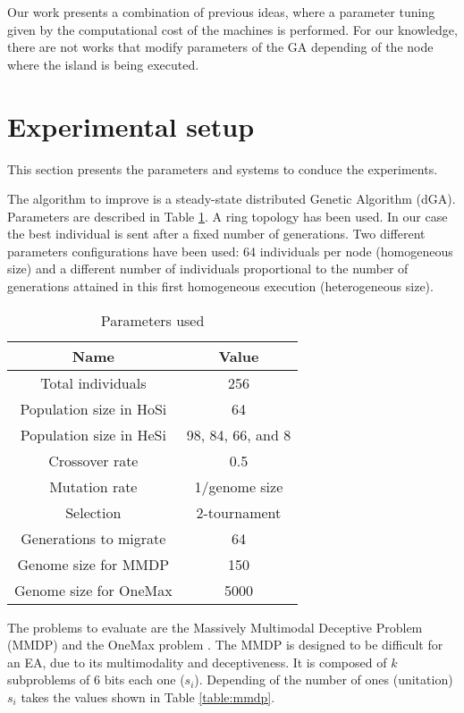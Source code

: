 \documentclass{sig-alternate}
\begin{document}
 Our work presents a combination of previous ideas, where a parameter tuning given by the computational cost of the machines is performed. For our knowledge, there are not works that modify parameters of the GA depending of the node where the island is being executed.


\section{Experimental setup}
\label{subsec:experiments}
This section presents the parameters and systems to conduce the experiments.

The algorithm to improve is a steady-state distributed Genetic Algorithm (dGA). Parameters are described in Table \ref{table:parameters}. A ring topology has been used. In our case the best individual is sent after a fixed number of generations.  Two different parameters configurations have been used: 64 individuals per node (homogeneous size) and a different number of individuals proportional to the number of generations attained in this first homogeneous execution (heterogeneous size).


\begin{table}
\centering
\begin{tabular}{|c|c|} \hline
Name & Value\\ \hline
Total individuals & 256\\ \hline
Population size in HoSi & 64 \\ \hline
Population size in HeSi & 98, 84, 66, and 8\\ \hline
Crossover rate & 0.5\\ \hline
Mutation rate & 1/genome size\\ \hline
Selection & 2-tournament \\ \hline
Generations to migrate & 64 \\
Genome size for MMDP & 150 \\
Genome size for OneMax & 5000 \\
\hline\end{tabular}
\label{table:parameters}
\caption{Parameters used}
\end{table}

The problems to evaluate are the Massively Multimodal Deceptive Problem (MMDP) \cite{goldberg92massive} and the OneMax problem \cite{ONEMAX}. The MMDP
 is designed to be difficult for an EA, due to
its multimodality and deceptiveness. It is composed of $k$ subproblems of 6 bits each one ($s_i$). Depending of
the number of ones (unitation) $s_i$ takes the values shown in Table \ref{table:mmdp}.  
\end{document}
